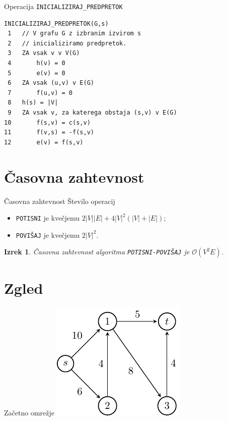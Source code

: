 \documentclass{beamer}
\newtheorem{thm}{Izrek}
\begin{document}
\begin{frame}[fragile]{Operacija \texttt{INICIALIZIRAJ\_PREDPRETOK}}
\begin{verbatim}
INICIALIZIRAJ_PREDPRETOK(G,s)
 1   // V grafu G z izbranim izvirom s
 2   // inicializiramo predpretok.
 3   ZA vsak v v V(G)
 4       h(v) = 0
 5       e(v) = 0
 6   ZA vsak (u,v) v E(G)
 7       f(u,v) = 0
 8   h(s) = |V|
 9   ZA vsak v, za katerega obstaja (s,v) v E(G)
10       f(s,v) = c(s,v)
11       f(v,s) = -f(s,v)
12       e(v) = f(s,v)
\end{verbatim}
\end{frame}


\section{Časovna zahtevnost}
\begin{frame}{Časovna zahtevnost}
    Število operacij
    \begin{itemize}
        \item \texttt{POTISNI} je kvečjemu $2|V||E| + 4|V|^2 (|V| + |E|)$;
        \item \texttt{POVIŠAJ} je kvečjemu $2|V|^2$.
    \end{itemize}
    \pause
    \begin{thm}
        Časovna zahtevnost algoritma \texttt{POTISNI-POVIŠAJ} je $\mathcal{O}(V^2E)$.
    \end{thm}
\end{frame}


\section{Zgled}
\begin{frame}{Začetno omrežje}
    \centering
    \includegraphics[scale=1.6]{../writing/images/graf2-1.pdf}
\end{frame}
\end{document}
